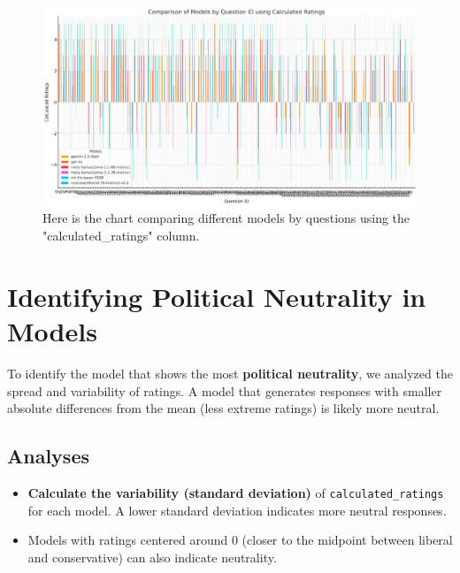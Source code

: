 \documentclass[10pt]{article}
\begin{document}
\begin{figure}[h!]
    \centering
    \includegraphics[width=\textwidth]{bars.png}
    \caption{Here is the chart comparing different models by questions using the "calculated_ratings" column.}
    \label{fig:bars}
\end{figure}

\section*{Identifying Political Neutrality in Models}

To identify the model that shows the most \textbf{political neutrality}, we analyzed the spread and variability of ratings. A model that generates responses with smaller absolute differences from the mean (less extreme ratings) is likely more neutral.

\subsection*{Analyses}
\begin{itemize}
    \item \textbf{Calculate the variability (standard deviation)} of \texttt{calculated\_ratings} for each model. A lower standard deviation indicates more neutral responses.
    \item Models with ratings centered around 0 (closer to the midpoint between liberal and conservative) can also indicate neutrality.
\end{itemize}
\end{document}
